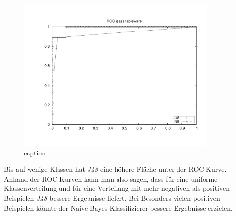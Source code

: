\begin{figure}[htbp]
	\centering
		\includegraphics[height=3in]{pics/a3/ROC_glass_tableware.pdf}
	\caption{caption}
	\label{fig:pics_a3_ROC_glass_tableware}
\end{figure}

Bis auf wenige Klassen hat \emph{J48} eine h\"ohere Fl\"ache unter der ROC Kurve.
Anhand der ROC Kurven kann man also sagen, dass f\"ur eine uniforme Klassenverteilung und f\"ur eine Verteilung mit mehr negativen als positiven Beispielen \emph{J48} bessere Ergebnisse liefert. Bei Besonders vielen positiven Beispielen k\"onnte der Naive Bayes Klassifizierer bessere Ergebnisse erzielen.


% 
% 
% 
% 
% 
% 
% 
